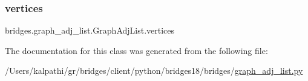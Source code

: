 \subsubsection{\texorpdfstring{vertices}{vertices}}
{\footnotesize\ttfamily bridges.\+graph\+\_\+adj\+\_\+list.\+Graph\+Adj\+List.\+vertices}



The documentation for this class was generated from the following file\+:\begin{DoxyCompactItemize}
\item 
/\+Users/kalpathi/gr/bridges/client/python/bridges18/bridges/\mbox{\hyperlink{graph__adj__list_8py}{graph\+\_\+adj\+\_\+list.\+py}}\end{DoxyCompactItemize}

